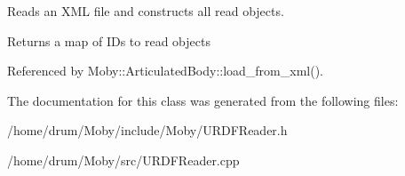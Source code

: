 Reads an X\-M\-L file and constructs all read objects. 

\begin{DoxyReturn}{Returns}
a map of I\-Ds to read objects 
\end{DoxyReturn}


Referenced by Moby\-::\-Articulated\-Body\-::load\-\_\-from\-\_\-xml().



The documentation for this class was generated from the following files\-:\begin{DoxyCompactItemize}
\item 
/home/drum/\-Moby/include/\-Moby/U\-R\-D\-F\-Reader.\-h\item 
/home/drum/\-Moby/src/U\-R\-D\-F\-Reader.\-cpp\end{DoxyCompactItemize}
